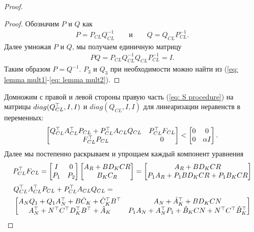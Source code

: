 \begin{proof}
\begin{proof}
		Обозначим ${P}$ и ${Q}$ как 
		\begin{align*}
			{P} = {P}_{CL}{Q}_{CL}^{-1} \qquad и \qquad {Q} ={Q}_{CL}{P}_{CL}^{-1}.
		\end{align*} 
		Далее умножая ${P}$ и ${Q}$, мы получаем единичную матрицу
		\begin{align*}
			{P}{Q}={P}_{CL}{Q}_{CL}^{-1}{Q}_{CL}{P}_{CL}^{-1}={I}.
		\end{align*}
		Таким образом ${P}={Q}^{-1}$.
		${P}_3$ и ${Q}_3$ при необходимости можно найти из (\ref{eq: lemma mult1}-\ref{eq: lemma mult2}).
	\end{proof}
	Домножим с правой и левой стороны правую часть (\ref{eq: S procedure}) на матрицы $diag({Q}_{CL}^\top, {I}, {I})$ и $diag({Q}_{CL}, {I}, {I})$ для линеаризации неравенств в переменных:
	\begin{align}
		\begin{bmatrix}
			{Q}_{CL}^\top{A}_{CL}^\top {P}_{CL} + {P}_{CL}^\top{A}_{CL}{Q}_{CL} & {P}_{CL}^\top{F}_{CL} \\
			{F}_{CL}^\top{P}_{CL} & 0
		\end{bmatrix} < 
		\begin{bmatrix}
			0 & 0\\
			0 & \alpha {I}
		\end{bmatrix}.
	\end{align}
	Далее мы постепенно раскрываем и упрощаем каждый компонент уравнения
	\begin{align}
		{P}_{CL}^\top{F}_{CL} = \begin{bmatrix}
			{I} & 0 \\
			{P}_{1} & {P}_{2}
		\end{bmatrix}
		\begin{bmatrix}
			{A}_R + {B}{D}_K{C}{R}\\ {B}_K{C}_R
		\end{bmatrix} =
		\begin{bmatrix}
			{A}_R + {B}{D}_K{C}{R}\\
			{P}_{1}{A}_R + {P}_{1}{B}{D}_K{C}{R}+{P}_1{B}_K{C}{R}
		\end{bmatrix}
	\end{align}
	\begin{align}
		&{Q}_{CL}^\top{A}_{CL}^\top {P}_{CL} + {P}_{CL}^\top{A}_{CL}{Q}_{CL} = \nonumber \\
		& \begin{bmatrix}
			{A}_N{Q}_{1} +{Q}_{1}{A}_N^\top + {B}{\hat{C}}_K +{\hat{C}}_K^\top{B}^\top & {A}_N + {\hat{A}}_K^\top +{B}{D}_K{C}{N}\\
			{A}_N^\top + {N}^\top{C}^\top{D}_K^\top{B}^\top+{\hat{A}}_K & {P}_{1}{A}_N +{A}_N^\top{P}_{1}+{\hat{B}}_K{C}{N}+{N}^\top{C}^\top{\hat{B}}_K^\top

\end{bmatrix}
\end{align}
\end{proof}
